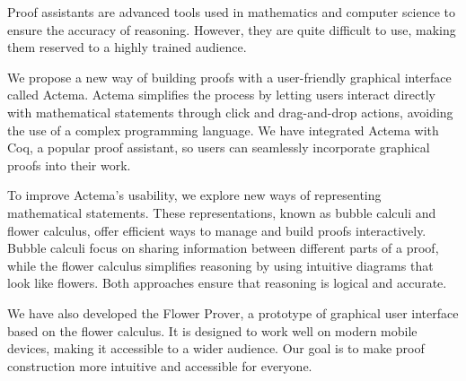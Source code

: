 Proof assistants are advanced tools used in mathematics and computer science to ensure the accuracy of reasoning. However, they are quite difficult to use, making them reserved to a highly trained audience.

We propose a new way of building proofs with a user-friendly graphical interface called Actema. Actema simplifies the process by letting users interact directly with mathematical statements through click and drag-and-drop actions, avoiding the use of a complex programming language. We have integrated Actema with Coq, a popular proof assistant, so users can seamlessly incorporate graphical proofs into their work.

To improve Actema's usability, we explore new ways of representing mathematical statements. These representations, known as bubble calculi and flower calculus, offer efficient ways to manage and build proofs interactively. Bubble calculi focus on sharing information between different parts of a proof, while the flower calculus simplifies reasoning by using intuitive diagrams that look like flowers. Both approaches ensure that reasoning is logical and accurate.

We have also developed the Flower Prover, a prototype of graphical user interface based on the flower calculus. It is designed to work well on modern mobile devices, making it accessible to a wider audience. Our goal is to make proof construction more intuitive and accessible for everyone.